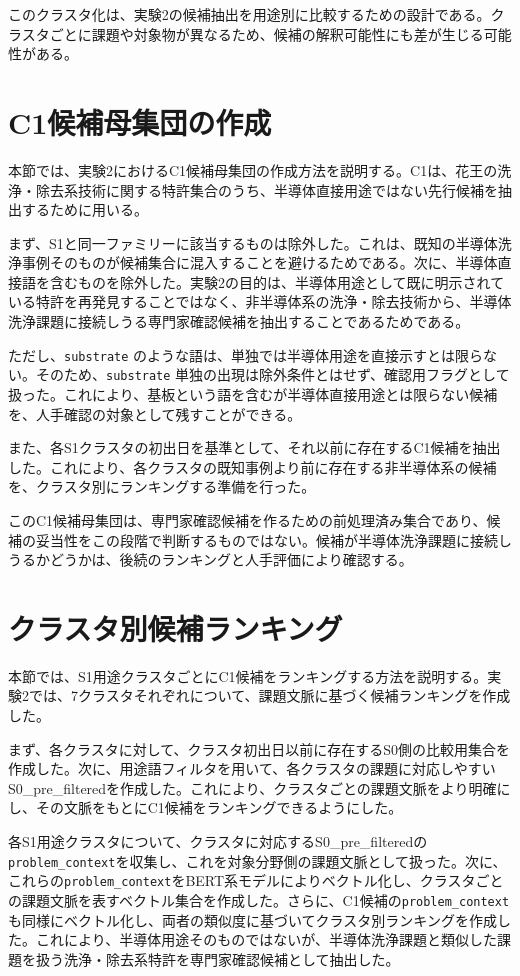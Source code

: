 このクラスタ化は、実験2の候補抽出を用途別に比較するための設計である。クラスタごとに課題や対象物が異なるため、候補の解釈可能性にも差が生じる可能性がある。

\section{C1候補母集団の作成}

本節では、実験2におけるC1候補母集団の作成方法を説明する。C1は、花王の洗浄・除去系技術に関する特許集合のうち、半導体直接用途ではない先行候補を抽出するために用いる。

まず、S1と同一ファミリーに該当するものは除外した。これは、既知の半導体洗浄事例そのものが候補集合に混入することを避けるためである。次に、半導体直接語を含むものを除外した。実験2の目的は、半導体用途として既に明示されている特許を再発見することではなく、非半導体系の洗浄・除去技術から、半導体洗浄課題に接続しうる専門家確認候補を抽出することであるためである。

ただし、\texttt{substrate} のような語は、単独では半導体用途を直接示すとは限らない。そのため、\texttt{substrate} 単独の出現は除外条件とはせず、確認用フラグとして扱った。これにより、基板という語を含むが半導体直接用途とは限らない候補を、人手確認の対象として残すことができる。

また、各S1クラスタの初出日を基準として、それ以前に存在するC1候補を抽出した。これにより、各クラスタの既知事例より前に存在する非半導体系の候補を、クラスタ別にランキングする準備を行った。

このC1候補母集団は、専門家確認候補を作るための前処理済み集合であり、候補の妥当性をこの段階で判断するものではない。候補が半導体洗浄課題に接続しうるかどうかは、後続のランキングと人手評価により確認する。

\section{クラスタ別候補ランキング}

本節では、S1用途クラスタごとにC1候補をランキングする方法を説明する。実験2では、7クラスタそれぞれについて、課題文脈に基づく候補ランキングを作成した。

まず、各クラスタに対して、クラスタ初出日以前に存在するS0側の比較用集合を作成した。次に、用途語フィルタを用いて、各クラスタの課題に対応しやすいS0\_pre\_filteredを作成した。これにより、クラスタごとの課題文脈をより明確にし、その文脈をもとにC1候補をランキングできるようにした。

各S1用途クラスタについて、クラスタに対応するS0\_pre\_filteredの\texttt{problem\_context}を収集し、これを対象分野側の課題文脈として扱った。次に、これらの\texttt{problem\_context}をBERT系モデルによりベクトル化し、クラスタごとの課題文脈を表すベクトル集合を作成した。さらに、C1候補の\texttt{problem\_context}も同様にベクトル化し、両者の類似度に基づいてクラスタ別ランキングを作成した。これにより、半導体用途そのものではないが、半導体洗浄課題と類似した課題を扱う洗浄・除去系特許を専門家確認候補として抽出した。

